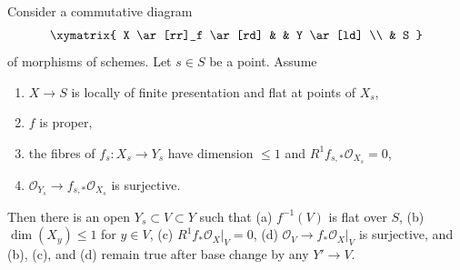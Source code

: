 %
\begin{lemma}
\label{lemma-h1-fibre-zero-h0-kappa}
Consider a commutative diagram
$$
\xymatrix{
X \ar[rr]_f \ar[rd] & & Y \ar[ld] \\
& S
}
$$
of morphisms of schemes. Let $s \in S$ be a point. Assume
\begin{enumerate}
\item $X \to S$ is locally of finite presentation and flat at
points of $X_s$,
\item $f$ is proper,
\item the fibres of $f_s : X_s \to Y_s$ have dimension $\leq 1$
and $R^1f_{s, *}\mathcal{O}_{X_s} = 0$,
\item $\mathcal{O}_{Y_s} \to f_{s, *}\mathcal{O}_{X_s}$ is surjective.
\end{enumerate}
Then there is an open $Y_s \subset V \subset Y$ such that
(a) $f^{-1}(V)$ is flat over $S$,
(b) $\dim(X_y) \leq 1$ for $y \in V$,
(c) $R^1f_*\mathcal{O}_X|_V = 0$,
(d) $\mathcal{O}_V \to f_*\mathcal{O}_X|_V$
is surjective,
and (b), (c), and (d) remain true after base change by any $Y' \to V$.
\end{lemma}


